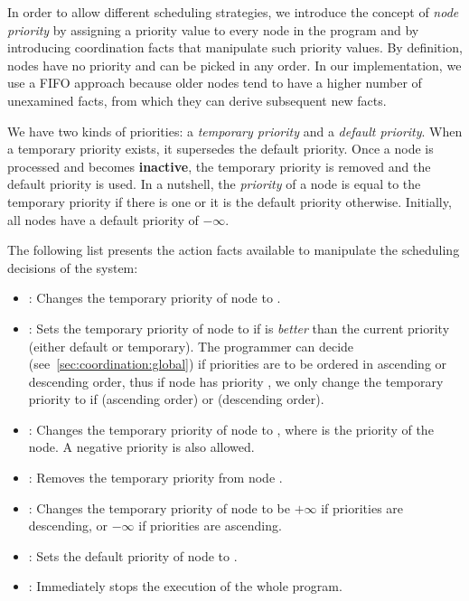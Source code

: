 
In order to allow different scheduling strategies, we introduce the concept of
\emph{node priority} by assigning a priority value to every node in the program
and by introducing coordination facts that manipulate such priority values.  By
definition, nodes have no priority and can be picked in any order. In our
implementation, we use a FIFO approach because older nodes tend to have a higher
number of unexamined facts, from which they can derive subsequent new facts.

We have two kinds of priorities: a \emph{temporary priority} and a \emph{default
priority}. When a temporary priority exists, it supersedes the default priority.
Once a node is processed and becomes \textbf{inactive}, the temporary priority
is removed and the default priority is used. In a nutshell, the \emph{priority}
of a node is equal to the temporary priority if there is one or it is the
default priority otherwise.  Initially, all nodes have a default priority of
$-\infty$.

The following list presents the action facts available to manipulate the
scheduling decisions of the system:

\begin{itemize}

   \item {}: Changes the temporary priority
      of node  to .


   \item {}: Sets the temporary priority of
      node  to  if  is \emph{better} than the current
      priority (either default or temporary). The programmer can decide
      (see~\ref{sec:coordination:global}) if priorities are to be ordered in
      ascending or descending order, thus if node  has priority
      , we only change the temporary priority to  if  (ascending order) or  (descending order).

   \item {}: Changes the temporary priority
      of node  to , where  is the priority of the
      node. A negative priority is also allowed.

   \item {}: Removes the temporary priority from node
   .

   \item {}: Changes the temporary priority of node
    to be $+\infty$ if priorities are descending, or $-\infty$ if
   priorities are ascending.

   \item {}: Sets the default
      priority of node  to .

   \item {}: Immediately stops the execution of the whole program.

\end{itemize}

